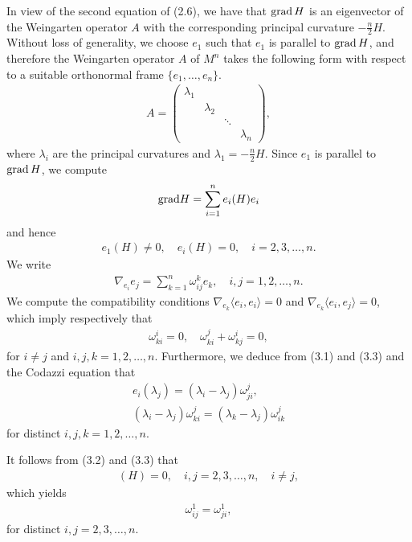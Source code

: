 \documentclass[twoside,reqno,A4]{amsart}
\theoremstyle{definition}
\theoremstyle{remark}
\numberwithin{equation}{section}
\begin{document}
In view of the second equation of (2.6), we have that ${\rm
grad}\,H$ is an eigenvector of the Weingarten operator $A$ with the
corresponding principal curvature $-\frac{n}{2}H$. Without loss of
generality, we choose $e_1$ such that $e_1$ is parallel to ${\rm
grad}\,H$, and therefore the Weingarten operator $A$ of $M^n$ takes
the following form with respect to a suitable orthonormal frame
$\{e_1,\ldots, e_n\}$.
\begin{eqnarray}
A=\left( \begin{array}{cccc} \lambda_1&\\
&\lambda_2 &\\&&\ddots &\\&&&\lambda_n
\end{array} \right),
\end{eqnarray}
where $\lambda_i$ are the principal curvatures and
$\lambda_1=-\frac{n}{2}H$. Since $e_1$ is parallel to ${\rm
grad}\,H$, we compute
\begin{eqnarray*}
{\rm grad}H=\sum_{i=1}^ne_i(H)e_i
\end{eqnarray*}
and hence
\begin{eqnarray}
e_1(H)\neq0,\quad e_i(H)=0, \quad i=2, 3, \ldots, n.
\end{eqnarray}
We write
\begin{eqnarray}
\nabla_{e_i}e_j=\sum_{k=1}^n\omega_{ij}^ke_k,\quad i,j=1, 2, \ldots,
n.
\end{eqnarray}
We compute the compatibility conditions $\nabla_{e_k}\langle
e_i,e_i\rangle=0$ and $\nabla_{e_k}\langle e_i,e_j\rangle=0$, which
imply respectively that
\begin{eqnarray}
\omega_{ki}^i=0,\quad \omega_{ki}^j+\omega_{kj}^i=0,
\end{eqnarray}
for $i\neq j$ and $i, j, k=1, 2, \ldots, n$. Furthermore, we deduce
from (3.1) and (3.3) and the Codazzi equation that
\begin{eqnarray}
e_i(\lambda_j)=(\lambda_i-\lambda_j)\omega_{ji}^j,\\
(\lambda_i-\lambda_j)\omega_{ki}^j=(\lambda_k-\lambda_j)\omega_{ik}^j
\end{eqnarray}
for distinct $i, j, k=1, 2, \ldots, n$.

It follows from (3.2) and (3.3) that
\begin{eqnarray*}
[e_i,e_j](H)=0,\quad i, j=2, 3, \ldots, n, \quad i\neq j,
\end{eqnarray*}
which yields
\begin{eqnarray}
\omega_{ij}^1=\omega_{ji}^1,
\end{eqnarray}
for distinct $i, j=2, 3, \ldots, n$.
\end{document}
